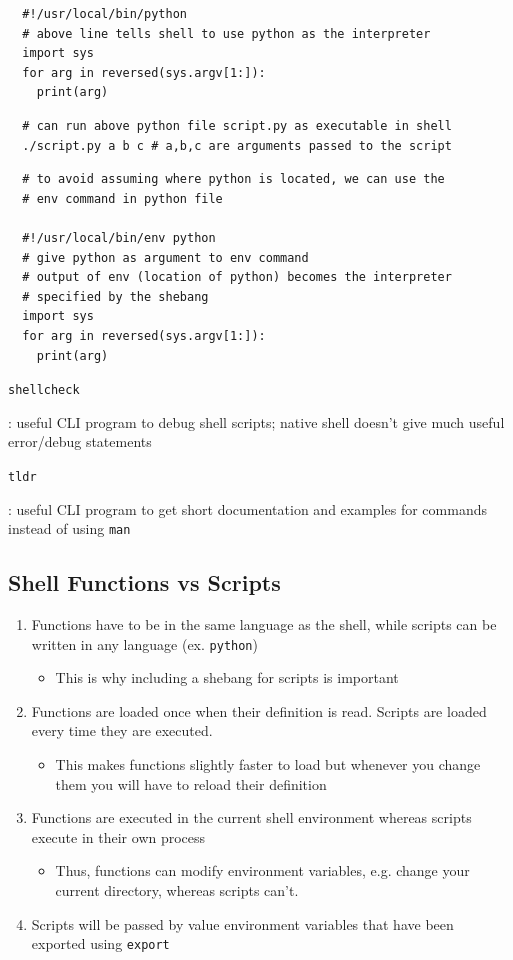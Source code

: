 \documentclass[letterpaper,12pt]{article}
\newcommand*{\lstitem}[1]{
  \setbox0\hbox{\lstinline{#1}}
  \item[\usebox0]
}
\begin{document}
\begin{lstlisting}
  #!/usr/local/bin/python
  # above line tells shell to use python as the interpreter
  import sys
  for arg in reversed(sys.argv[1:]):
    print(arg)
\end{lstlisting}

\begin{lstlisting}
  # can run above python file script.py as executable in shell
  ./script.py a b c # a,b,c are arguments passed to the script
\end{lstlisting}

\begin{lstlisting}
  # to avoid assuming where python is located, we can use the
  # env command in python file

  #!/usr/local/bin/env python
  # give python as argument to env command
  # output of env (location of python) becomes the interpreter
  # specified by the shebang
  import sys
  for arg in reversed(sys.argv[1:]):
    print(arg)
\end{lstlisting}

\begin{description}
 \lstitem{shellcheck}: useful CLI program to debug shell scripts; native shell doesn't give much useful error/debug statements
 \lstitem{tldr}: useful CLI program to get short documentation and examples for commands instead of using \lstinline{man}
\end{description}

\subsection{Shell Functions vs Scripts}
\begin{enumerate}
 \item Functions have to be in the same language as the shell, while scripts can be written in any language (ex. \lstinline{python})
       \begin{itemize}
        \item This is why including a shebang for scripts is important
       \end{itemize}
 \item Functions are loaded once when their definition is read. Scripts are loaded every time they are executed.
       \begin{itemize}
        \item This makes functions slightly faster to load but whenever you change them you will have to reload their definition
       \end{itemize}
 \item  Functions are executed in the current shell environment whereas scripts execute in their own process
       \begin{itemize}
        \item Thus, functions can modify environment variables, e.g. change your current directory, whereas scripts can’t.
       \end{itemize}
 \item Scripts will be passed by value environment variables that have been exported using \lstinline{export}
\end{enumerate}
\end{document}
